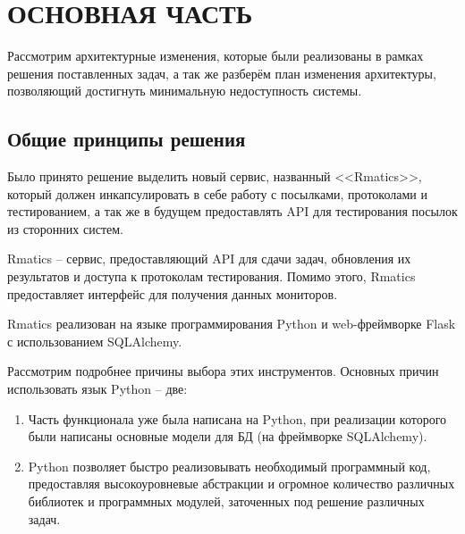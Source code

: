 \chapter{\MakeUppercase{Основная часть}}

Рассмотрим архитектурные изменения, которые были реализованы в рамках решения поставленных задач, 
а так же разберём план изменения архитектуры, позволяющий достигнуть минимальную недоступность системы.

\section{Общие принципы решения}

Было принято решение выделить новый сервис, названный <<Rmatics>>, который должен инкапсулировать в себе работу с посылками, протоколами и тестированием,
а так же в будущем предоставлять API для тестирования посылок из сторонних систем.

Rmatics -- сервис, предоставляющий API для сдачи задач, обновления их результатов и доступа к протоколам тестирования. 
Помимо этого, Rmatics предоставляет интерфейс для получения данных мониторов.

Rmatics реализован на языке программирования Python и web-фреймворке Flask с использованием SQLAlchemy.


Рассмотрим подробнее причины выбора этих инструментов. Основных причин использовать язык Python -- две:

\begin{enumerate}
    \item Часть функционала уже была написана на Python, при реализации которого были написаны основные модели для БД (на фреймворке SQLAlchemy).
    \item Python позволяет быстро реализовывать необходимый программный код, 
предоставляя высокоуровневые абстракции и огромное количество различных библиотек и программных модулей, заточенных под решение различных задач.
\end{enumerate}